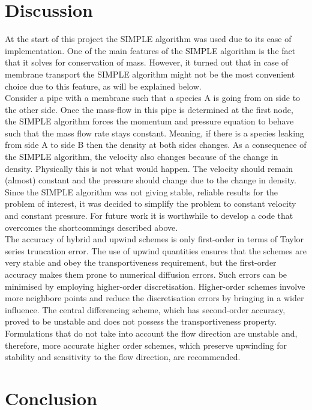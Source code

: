 \section{Discussion}
At the start of this project the SIMPLE algorithm was used due to its ease of implementation. One of the main features of the SIMPLE algorithm is the fact that it solves for conservation of mass. However, it turned out that in case of membrane transport the SIMPLE algorithm might not be the most convenient choice due to this feature, as will be explained below. \\

Consider a pipe with a membrane such that a species A is going from on side to the other side. Once the mass-flow in this pipe is determined at the first node, the SIMPLE algorithm forces the momentum and pressure equation to behave such that the mass flow rate stays constant. Meaning, if there is a species leaking from side A to side B then the density at both sides changes. As a consequence of the SIMPLE algorithm, the velocity also changes because of the change in density. Physically this is not what would happen. The velocity should remain (almost) constant and the pressure should change due to the change in density. \\

Since the SIMPLE algorithm was not giving stable, reliable results for the problem of interest, it was decided to simplify the problem to constant velocity and constant pressure. For future work it is worthwhile to develop a code that overcomes the shortcommings described above. \\

The accuracy of hybrid and upwind schemes is only first-order in terms of Taylor series truncation error. The use of upwind quantities ensures that the schemes are very stable and obey the transportiveness requirement, but the first-order accuracy makes them prone to numerical diffusion errors. Such errors can be minimised by employing higher-order discretisation. Higher-order schemes involve more neighbore points and reduce the discretisation errors by bringing in a wider influence. The central differencing scheme, which has second-order accuracy, proved to be unstable and does not possess the transportiveness property. Formulations that do not take into account the flow direction are unstable and, therefore, more accurate higher order schemes, which preserve upwinding for stability and sensitivity to the flow direction, are recommended. 

\newpage

\section{Conclusion}